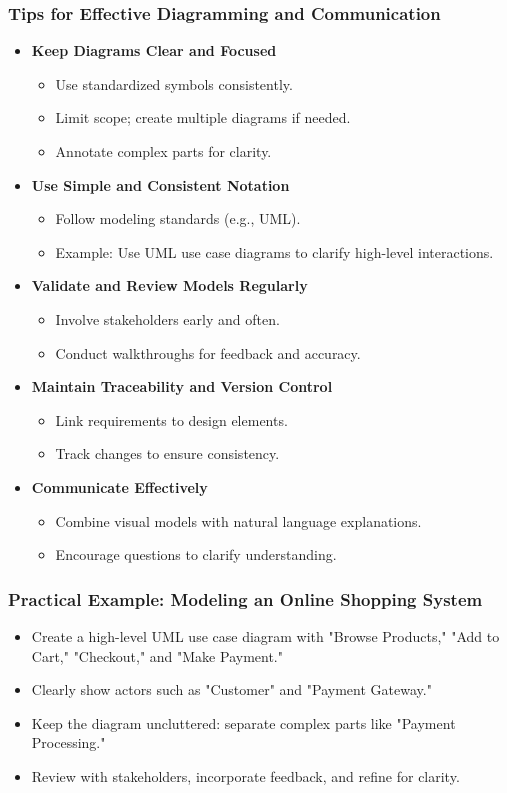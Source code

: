 \documentclass{beamer}
\begin{document}
\begin{frame}[fragile]
\frametitle{Tips for Effective Diagramming and Communication}
\begin{itemize}
    \item \textbf{Keep Diagrams Clear and Focused}
    \begin{itemize}
        \item Use standardized symbols consistently.
        \item Limit scope; create multiple diagrams if needed.
        \item Annotate complex parts for clarity.
    \end{itemize}
    \item \textbf{Use Simple and Consistent Notation}
    \begin{itemize}
        \item Follow modeling standards (e.g., UML).
        \item Example: Use UML use case diagrams to clarify high-level interactions.
    \end{itemize}
    \item \textbf{Validate and Review Models Regularly}
    \begin{itemize}
        \item Involve stakeholders early and often.
        \item Conduct walkthroughs for feedback and accuracy.
    \end{itemize}
    \item \textbf{Maintain Traceability and Version Control}
    \begin{itemize}
        \item Link requirements to design elements.
        \item Track changes to ensure consistency.
    \end{itemize}
    \item \textbf{Communicate Effectively}
    \begin{itemize}
        \item Combine visual models with natural language explanations.
        \item Encourage questions to clarify understanding.
    \end{itemize}
\end{itemize}
\end{frame}

\begin{frame}[fragile]
\frametitle{Practical Example: Modeling an Online Shopping System}
\begin{itemize}
    \item Create a high-level UML use case diagram with "Browse Products," "Add to Cart," "Checkout," and "Make Payment."
    \item Clearly show actors such as "Customer" and "Payment Gateway."
    \item Keep the diagram uncluttered: separate complex parts like "Payment Processing."
    \item Review with stakeholders, incorporate feedback, and refine for clarity.
\end{itemize}
\end{frame}
\end{document}
